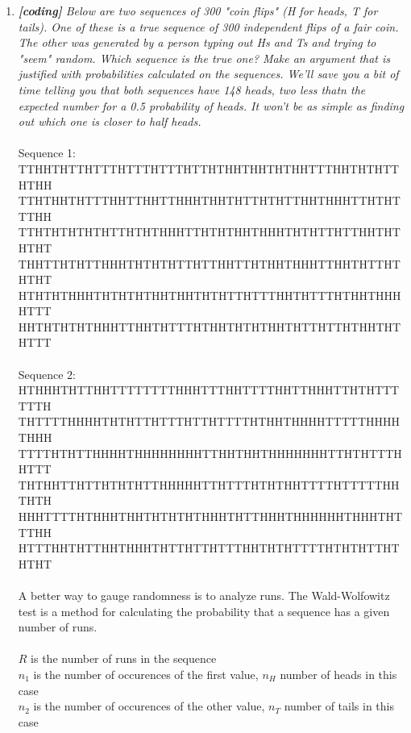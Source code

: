 \documentclass{article} %
\begin{document}
\begin{enumerate}
	\item \textit{\textbf{[coding]} Below are two sequences of 300 "coin flips" (H for heads, T for tails). One of these is a true sequence of 300 independent flips of a fair coin. The other was generated by a person typing out Hs and Ts and trying to "seem" random. Which sequence is the true one? Make an argument that is justified with probabilities calculated on the sequences. We'll save you a bit of time telling you that both sequences have 148 heads, two less thatn the expected number for a 0.5 probability of heads. It won't be as simple as finding out which one is closer to half heads.}\\
	\\
	Sequence 1:\\
	TTHHTHTTHTTTHTTTHTTTHTTHTHHTHHTHTHHTTTHHTHTHTTHTHH\\
	TTHTHHTHTTTHHTTHHTTHHHTHHTHTTHTHTTHHTHHHTTHTHTTTHH\\
	TTHTHTHTHTHTTHTHTHHHTTHTHTHHTHHHTHTHTTHTTHHTHTHTHT\\
	THHTTHTHTTHHHTHTHTHTTHTTHHTTHTHHTHHHTTHHTHTTHTHTHT\\
	HTHTHTHHHTHTHTHTHHTHHTHTHTTHTTTHHTHTTTHTHHTHHHHTTT\\
	HHTHTHTHTHHHTTHHTHTTTHTHHTHTHTHHTHTTHTTHTHHTHTHTTT\\
	\\
	Sequence 2:\\
	HTHHHTHTTHHTTTTTTTTHHHTTTHHTTTTHHTTHHHTTHTHTTTTTTH\\
	THTTTTHHHHTHTHTTHTTTHTTHTTTTHTHHTHHHHTTTTTHHHHTHHH\\
	TTTTHTHTTHHHHTHHHHHHHHTTHHTHHTHHHHHHHTTHTHTTTHHTTT\\
	THTHHTTHTTHTHTHTTHHHHHTTHTTTHTHTHHTTTTHTTTTTHHTHTH\\
	HHHTTTTHTHHHTHHTHTHTHTHHHTHTTHHHTHHHHHHTHHHTHTTTHH\\
	HTTTHHTHTTHHTHHHTHTTHTTHTTTHHTHTHTTTTHTHTHTTHTHTHT\\
	\\
	A better way to gauge randomness is to analyze runs. The Wald-Wolfowitz test is a method for calculating the probability that a sequence has a given number of runs.\\
	\\
	$R$ is the number of runs in the sequence\\
	$n_1$ is the number of occurences of the first value, $n_H$ number of heads in this case\\
	$n_2$ is the number of occurences of the other value, $n_T$ number of tails in this case

\end{enumerate}
\end{document}
